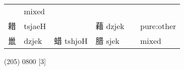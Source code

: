 \documentclass[14pt,a4paper]{scrartcl}
\begin{document}
\begin{longtable}[c]{@{}llllll@{}}
\begin{minipage}[t]{0.14\columnwidth}\raggedright\strut
\strut\end{minipage} &
\begin{minipage}[t]{0.14\columnwidth}\raggedright\strut
mixed
\strut\end{minipage}\tabularnewline
\begin{minipage}[t]{0.14\columnwidth}\raggedright\strut
耤
\strut\end{minipage} &
\begin{minipage}[t]{0.14\columnwidth}\raggedright\strut
tsjaeH
\strut\end{minipage} &
\begin{minipage}[t]{0.14\columnwidth}\raggedright\strut
\strut\end{minipage} &
\begin{minipage}[t]{0.14\columnwidth}\raggedright\strut
藉 dzjek
\strut\end{minipage} &
\begin{minipage}[t]{0.14\columnwidth}\raggedright\strut
\strut\end{minipage} &
\begin{minipage}[t]{0.14\columnwidth}\raggedright\strut
pure:other
\strut\end{minipage}\tabularnewline
\begin{minipage}[t]{0.14\columnwidth}\raggedright\strut
巤
\strut\end{minipage} &
\begin{minipage}[t]{0.14\columnwidth}\raggedright\strut
dzjek
\strut\end{minipage} &
\begin{minipage}[t]{0.14\columnwidth}\raggedright\strut
蜡 tshjoH
\strut\end{minipage} &
\begin{minipage}[t]{0.14\columnwidth}\raggedright\strut
腊 sjek
\strut\end{minipage} &
\begin{minipage}[t]{0.14\columnwidth}\raggedright\strut
\strut\end{minipage} &
\begin{minipage}[t]{0.14\columnwidth}\raggedright\strut
mixed
\strut\end{minipage}\tabularnewline
\bottomrule
\end{longtable}

(205) 0800 {[}3{]}
\end{document}
